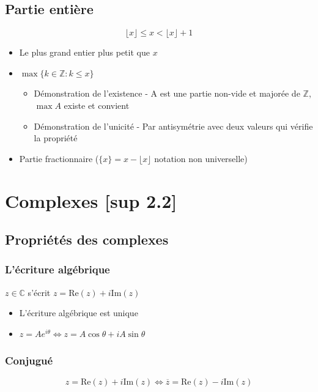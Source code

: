 \documentclass[openany]{book}
\begin{document}
\subsection{Partie entière}
\[ \lfloor x \rfloor \leq x < \lfloor x \rfloor + 1 \]

\begin{itemize}
    \item Le plus grand entier plus petit que $x$
    \item $ \max{\{ k \in \mathbb{Z} : k \leq x \}} $
        \begin{itemize}
            \item Démonstration de l'existence - A est une partie non-vide et majorée de $\mathbb{Z}$, $\max A$ existe et convient 
            \item Démonstration de l'unicité - Par antisymétrie avec deux valeurs qui vérifie la propriété
        \end{itemize}
    \item Partie fractionnaire ($\{x\} = x- \lfloor x\rfloor$ notation non universelle)
\end{itemize}

\clearpage

\section{Complexes [sup 2.2]}
\subsection{Propriétés des complexes}
\subsubsection{L'écriture algébrique}
$ z \in \mathbb{C} $ s'écrit $ z = \text{Re}(z) + i\text{Im} (z) $
\begin{itemize}
    \item L'écriture algébrique est unique
    \item $ z=Ae^{i\theta} \iff z = A\cos{\theta} + iA\sin{\theta} $
\end{itemize}

\subsubsection{Conjugué}
\[ z = \text{Re}(z) + i\text{Im} (z) \iff \overline{z} = \text{Re}(z) - i\text{Im}(z) \]
\end{document}
